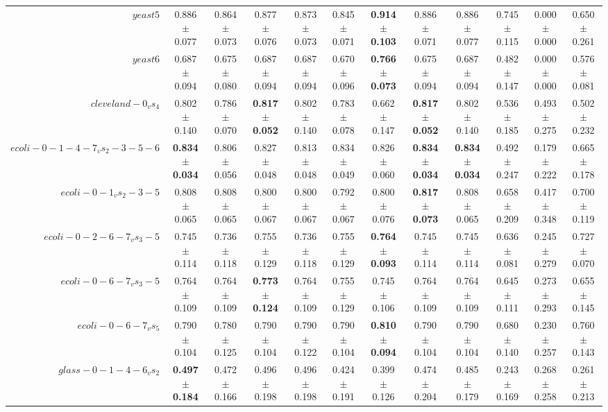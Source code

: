 \begin{table}[!ht]
{\begin{tabular}{r c c c c c c c c c c c}
$yeast5$ & 0.886 $\pm$ 0.077 & 0.864 $\pm$ 0.073 & 0.877 $\pm$ 0.076 & 0.873 $\pm$ 0.073 & 0.845 $\pm$ 0.071 & \textbf{0.914 $\pm$ 0.103} & 0.886 $\pm$ 0.071 & 0.886 $\pm$ 0.077 & 0.745 $\pm$ 0.115 & 0.000 $\pm$ 0.000 & 0.650 $\pm$ 0.261 \\
$yeast6$ & 0.687 $\pm$ 0.094 & 0.675 $\pm$ 0.080 & 0.687 $\pm$ 0.094 & 0.687 $\pm$ 0.094 & 0.670 $\pm$ 0.096 & \textbf{0.766 $\pm$ 0.073} & 0.675 $\pm$ 0.094 & 0.687 $\pm$ 0.094 & 0.482 $\pm$ 0.147 & 0.000 $\pm$ 0.000 & 0.576 $\pm$ 0.081 \\
$cleveland-0_vs_4$ & 0.802 $\pm$ 0.140 & 0.786 $\pm$ 0.070 & \textbf{0.817 $\pm$ 0.052} & 0.802 $\pm$ 0.140 & 0.783 $\pm$ 0.078 & 0.662 $\pm$ 0.147 & \textbf{0.817 $\pm$ 0.052} & 0.802 $\pm$ 0.140 & 0.536 $\pm$ 0.185 & 0.493 $\pm$ 0.275 & 0.502 $\pm$ 0.232 \\
$ecoli-0-1-4-7_vs_2-3-5-6$ & \textbf{0.834 $\pm$ 0.034} & 0.806 $\pm$ 0.056 & 0.827 $\pm$ 0.048 & 0.813 $\pm$ 0.048 & 0.834 $\pm$ 0.049 & 0.826 $\pm$ 0.060 & \textbf{0.834 $\pm$ 0.034} & \textbf{0.834 $\pm$ 0.034} & 0.492 $\pm$ 0.247 & 0.179 $\pm$ 0.222 & 0.665 $\pm$ 0.178 \\
$ecoli-0-1_vs_2-3-5$ & 0.808 $\pm$ 0.065 & 0.808 $\pm$ 0.065 & 0.800 $\pm$ 0.067 & 0.800 $\pm$ 0.067 & 0.792 $\pm$ 0.067 & 0.800 $\pm$ 0.076 & \textbf{0.817 $\pm$ 0.073} & 0.808 $\pm$ 0.065 & 0.658 $\pm$ 0.209 & 0.417 $\pm$ 0.348 & 0.700 $\pm$ 0.119 \\
$ecoli-0-2-6-7_vs_3-5$ & 0.745 $\pm$ 0.114 & 0.736 $\pm$ 0.118 & 0.755 $\pm$ 0.129 & 0.736 $\pm$ 0.118 & 0.755 $\pm$ 0.129 & \textbf{0.764 $\pm$ 0.093} & 0.745 $\pm$ 0.114 & 0.745 $\pm$ 0.114 & 0.636 $\pm$ 0.081 & 0.245 $\pm$ 0.279 & 0.727 $\pm$ 0.070 \\
$ecoli-0-6-7_vs_3-5$ & 0.764 $\pm$ 0.109 & 0.764 $\pm$ 0.109 & \textbf{0.773 $\pm$ 0.124} & 0.764 $\pm$ 0.109 & 0.755 $\pm$ 0.129 & 0.745 $\pm$ 0.106 & 0.764 $\pm$ 0.109 & 0.764 $\pm$ 0.109 & 0.645 $\pm$ 0.111 & 0.273 $\pm$ 0.293 & 0.655 $\pm$ 0.145 \\
$ecoli-0-6-7_vs_5$ & 0.790 $\pm$ 0.104 & 0.780 $\pm$ 0.125 & 0.790 $\pm$ 0.104 & 0.790 $\pm$ 0.122 & 0.790 $\pm$ 0.104 & \textbf{0.810 $\pm$ 0.094} & 0.790 $\pm$ 0.104 & 0.790 $\pm$ 0.104 & 0.680 $\pm$ 0.140 & 0.230 $\pm$ 0.257 & 0.760 $\pm$ 0.143 \\
$glass-0-1-4-6_vs_2$ & \textbf{0.497 $\pm$ 0.184} & 0.472 $\pm$ 0.166 & 0.496 $\pm$ 0.198 & 0.496 $\pm$ 0.198 & 0.424 $\pm$ 0.191 & 0.399 $\pm$ 0.126 & 0.474 $\pm$ 0.204 & 0.485 $\pm$ 0.179 & 0.243 $\pm$ 0.169 & 0.268 $\pm$ 0.258 & 0.261 $\pm$ 0.213 \\

\end{tabular}}
\end{table}
